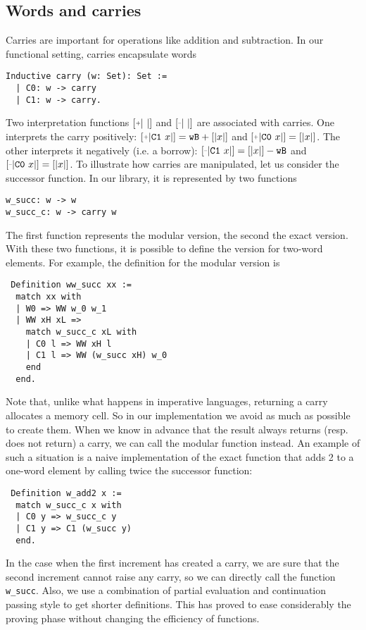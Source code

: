 \subsection{Words and carries}

Carries are important for operations like addition and subtraction.
In our functional setting, carries encapsulate words
\begin{verbatim}
Inductive carry (w: Set): Set :=
  | C0: w -> carry
  | C1: w -> carry.
\end{verbatim}
Two interpretation functions  $\ICP{\ }$ and $\ICM{\ }$ are associated with carries.
One interprets the carry positively: $\ICP{\CI x} = \wB + [|x|]$ and
$\ICP{\CO x} = [|x|]$. 
The other interprets it negatively (i.e. a borrow):
$\ICM{\CI x} = [|x|] - \wB$ and $\ICM{\CO x} = [|x|]$.
To illustrate how carries are manipulated, let us consider the successor function.
In our library, it is represented by two functions
\begin{verbatim}
w_succ: w -> w
w_succ_c: w -> carry w
\end{verbatim}
The first function represents the modular version, the second the exact 
version. With these two functions, it is possible to define the version
for two-word elements. For example, the definition for the modular version is
\begin{verbatim}
 Definition ww_succ xx :=
  match xx with
  | W0 => WW w_0 w_1
  | WW xH xL =>
    match w_succ_c xL with
    | C0 l => WW xH l
    | C1 l => WW (w_succ xH) w_0
    end
  end.
\end{verbatim}
Note that, unlike what happens in imperative languages, returning
a carry allocates a memory cell. So in our implementation
we avoid as much as possible to create them. When we know in advance 
that the result always returns (resp. does not return) a carry, we can call the modular function instead. 
An example of such a situation is a naive implementation of the exact function that adds 2 to a 
one-word element by calling twice the successor function:
\begin{verbatim}
 Definition w_add2 x :=
  match w_succ_c x with
  | C0 y => w_succ_c y
  | C1 y => C1 (w_succ y)
  end.
\end{verbatim}
In the case when the first increment has created a carry, we are sure that the second
increment cannot raise any carry, so we can directly call the function {\tt w\_succ}.
Also, we use a combination of partial evaluation and continuation passing style to get
shorter definitions. This has proved to ease considerably the proving phase without
changing the efficiency of functions.

